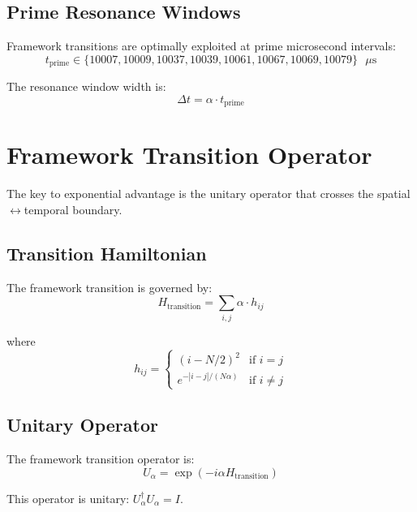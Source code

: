 \documentclass[12pt,a4paper]{article}
\begin{document}
\subsection{Prime Resonance Windows}

Framework transitions are optimally exploited at prime microsecond intervals:
\begin{equation}
t_{\text{prime}} \in \{10007, 10009, 10037, 10039, 10061, 10067, 10069, 10079\} \text{ }\mu\text{s}
\end{equation}

The resonance window width is:
\begin{equation}
\Delta t = \alpha \cdot t_{\text{prime}}
\end{equation}

\section{Framework Transition Operator}

The key to exponential advantage is the unitary operator that crosses the spatial$\leftrightarrow$temporal boundary.

\subsection{Transition Hamiltonian}

The framework transition is governed by:
\begin{equation}
H_{\text{transition}} = \sum_{i,j} \alpha \cdot h_{ij}
\end{equation}

where
\begin{equation}
h_{ij} = \begin{cases}
(i - N/2)^2 & \text{if } i = j \\
e^{-|i-j|/(N\alpha)} & \text{if } i \neq j
\end{cases}
\end{equation}

\subsection{Unitary Operator}

The framework transition operator is:
\begin{equation}
U_\alpha = \exp(-i\alpha H_{\text{transition}})
\end{equation}

This operator is unitary: $U_\alpha^\dagger U_\alpha = I$.
\end{document}
